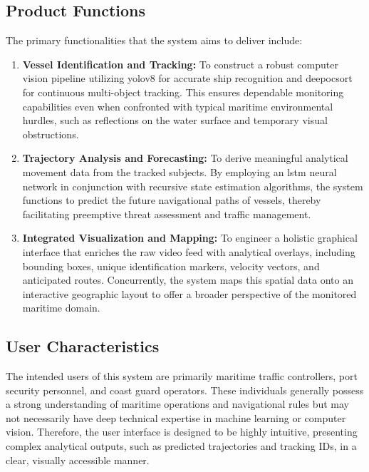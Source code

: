 \subsection{Product Functions}
The primary functionalities that the system aims to deliver include:
\begin{enumerate}
\item \textbf{Vessel Identification and Tracking:} To construct a robust computer vision pipeline utilizing \gls{yolov8} for accurate ship recognition and \gls{deepocsort} for continuous multi-object tracking. This ensures dependable monitoring capabilities even when confronted with typical maritime environmental hurdles, such as reflections on the water surface and temporary visual obstructions.
\item \textbf{Trajectory Analysis and Forecasting:} To derive meaningful analytical movement data from the tracked subjects. By employing an \gls{lstm} neural network in conjunction with recursive state estimation algorithms, the system functions to predict the future navigational paths of vessels, thereby facilitating preemptive threat assessment and traffic management.
\item \textbf{Integrated Visualization and Mapping:} To engineer a holistic graphical interface that enriches the raw video feed with analytical overlays, including bounding boxes, unique identification markers, velocity vectors, and anticipated routes. Concurrently, the system maps this spatial data onto an interactive geographic layout to offer a broader perspective of the monitored maritime domain.
\end{enumerate}

\subsection{User Characteristics}
The intended users of this system are primarily maritime traffic controllers, port security personnel, and coast guard operators. These individuals generally possess a strong understanding of maritime operations and navigational rules but may not necessarily have deep technical expertise in machine learning or computer vision. Therefore, the user interface is designed to be highly intuitive, presenting complex analytical outputs, such as predicted trajectories and tracking IDs, in a clear, visually accessible manner. 

